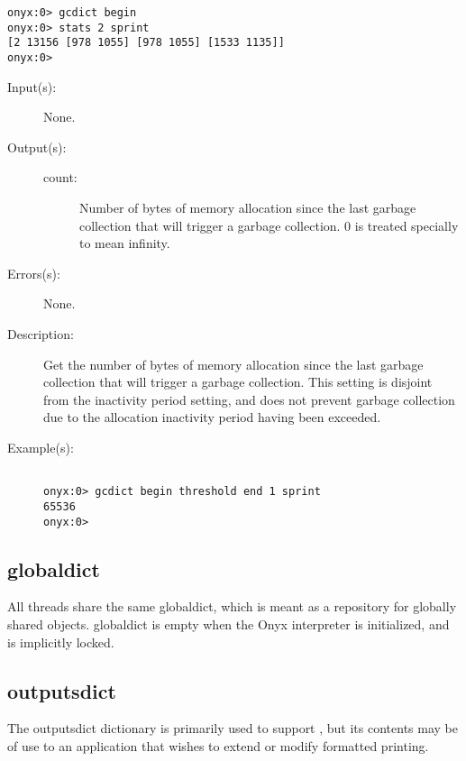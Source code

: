 \begin{description}
\begin{description}
\begin{verbatim}
onyx:0> gcdict begin
onyx:0> stats 2 sprint
[2 13156 [978 1055] [978 1055] [1533 1135]]
onyx:0>
		\end{verbatim}
	\end{description}
\label{gcdict:threshold}
\item[{\onyxop{--}{threshold}{count}}: ]
	\begin{description}\item[]
	\item[Input(s): ] None.
	\item[Output(s): ]
		\begin{description}\item[]
		\item[count: ]
			Number of bytes of memory allocation since the last
			garbage collection that will trigger a garbage
			collection.  0 is treated specially to mean infinity.
		\end{description}
	\item[Errors(s): ] None.
	\item[Description: ]
		Get the number of bytes of memory allocation since the last
		garbage collection that will trigger a garbage collection.  This
		setting is disjoint from the inactivity period setting, and does
		not prevent garbage collection due to the allocation inactivity
		period having been exceeded.
	\item[Example(s): ]\begin{verbatim}

onyx:0> gcdict begin threshold end 1 sprint
65536
onyx:0>
		\end{verbatim}
	\end{description}
\end{description}

\subsection{globaldict}
\label{sec:globaldict}

All threads share the same globaldict, which is meant as a repository for
globally shared objects.  globaldict is empty when the Onyx interpreter is
initialized, and is implicitly locked.

\subsection{outputsdict}
\label{sec:outputsdict}

The outputsdict dictionary is primarily used to support
, but its contents may be of
use to an application that wishes to extend or modify formatted printing.

